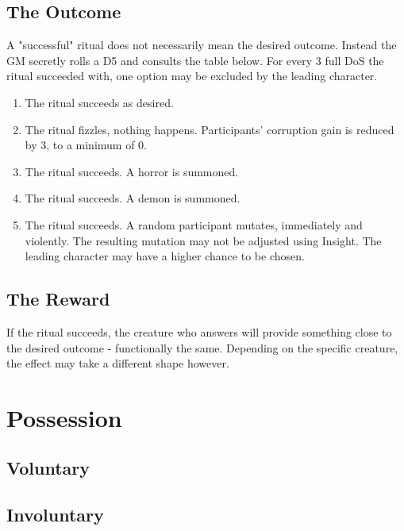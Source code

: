 \documentclass[12pt,a4paper,openany]{book}
\begin{document}
	\section{The Outcome}
	A "successful" ritual does not necessarily mean the desired outcome. Instead the GM secretly rolls a D5 and consults the table below. For every 3 full DoS the ritual succeeded with, one option may be excluded by the leading character.
	\par
	\begin{enumerate}
		\raggedright
		\setlength\itemsep{-8mm}
		\item The ritual succeeds as desired.
		\item The ritual fizzles, nothing happens. Participants' corruption gain is reduced by 3, to a minimum of 0.
		\item The ritual succeeds. A horror is summoned.
		\item The ritual succeeds. A demon is summoned.
		\item The ritual succeeds. A random participant mutates, immediately and violently. The resulting mutation may not be adjusted using Insight.
		The leading character may have a higher chance to be chosen.
	\end{enumerate}
	\section{The Reward}
	If the ritual succeeds, the creature who answers will provide something close to the desired outcome - functionally the same.
	Depending on the specific creature, the effect may take a different shape however.
	
	\chapter{Possession}
	\section{Voluntary}
	\section{Involuntary}
	
\end{document}
